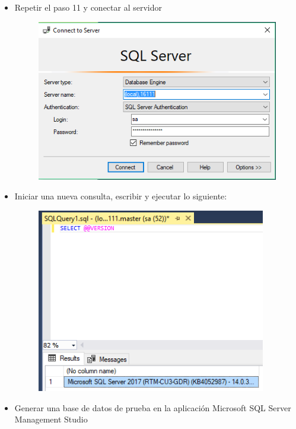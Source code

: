 \begin{itemize}
\begin{figure}[H]
\begin{center}
		\end{center}
		\end{figure}  
          \item Repetir el paso 11 y conectar al servidor
		\begin{figure}[H]
		\begin{center}
		\includegraphics[width=15cm]{./Imagenes/c5}
		\end{center}
		\end{figure}  
         \item Iniciar una nueva consulta, escribir y ejecutar lo siguiente:
		\begin{figure}[H]
		\begin{center}
		\includegraphics[width=10cm]{./Imagenes/c6}
		\end{center}
		\end{figure}  
          \item Generar una base de datos de prueba en la aplicación Microsoft SQL Server Management Studio

\end{itemize}
